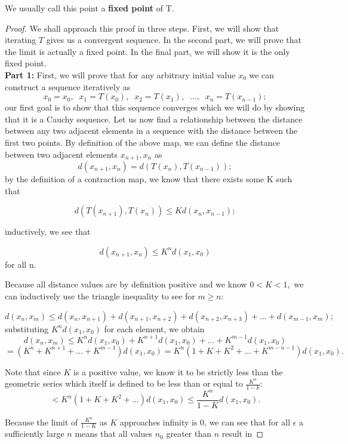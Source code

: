 \documentclass{article}
\theoremstyle{remark}
\begin{document}
We usually call this point a \textbf{fixed point} of T.
\begin{proof}

We shall approach this proof in three steps. First, we will show that iterating $T$ gives us a convergent sequence. In the second part, we will prove that the limit is actually a fixed point. In the final part, we will show it is the only fixed point.\\

\textbf{Part 1: }First, we will prove that for any arbitrary initial value $x_0$ we can construct a sequence iteratively as 
$$x_0 = x_0, \;\; x_1 = T(x_0), \;\;x_2 = T(x_1), \;\;..., \;\;x_n = T(x_{n-1});$$
our first goal is to show that this sequence converges which we will do by showing that it is a Cauchy sequence.
Let us now find a relationship between the distance between any two adjacent elements in a sequence with the distance between the first two points. By definition of the above map, we can define the distance between two adjacent elements $x_{n+1}, x_{n}$ as
$$d(x_{n+1} , x_{n}) = d(T(x_{n}) , T(x_{n-1}));$$
by the definition of a contraction map, we know that there exists some K such that

$$d(T(x_{n+1}) , T(x_{n})) \leq Kd(x_{n}, x_{n-1}); $$


inductively, we see that

$$d(x_{n+1} , x_{n}) \leq K^{n}d(x_{1}, x_{0})$$
for all n.

Because all distance values are by definition positive and we know $0<K<1,$  we can inductively use the triangle inequality to see for $m \geq n$:

$$d(x_{n} , x_{m}) \leq d(x_n, x_{n+1}) + d(x_{n+1}, x_{n+2}) + d(x_{n+2}, x_{n+3}) +  ... + d(x_{m-1}, x_{m});$$
substituting $K^{n}d(x_{1}, x_{0})$ for each element, we obtain
$$d(x_{n} , x_{m}) \leq K^{n}d(x_{1}, x_{0}) + K^{n+1}d(x_{1}, x_{0}) + ... + K^{m-1}d(x_{1}, x_{0})$$
$$ = (K^n + K^{n+1} + ... + K^{m-1})d(x_1, x_0) = K^n(1+ K + K^2 + ... + K^{m-n-1})d(x_1, x_0).$$

Note that since $K$ is a positive value, we know it to be strictly less than the geometric series which itself is defined to be less than or equal to $\frac{K^n}{1-k}$:
$$ < K^n(1+ K + K^2 + ... )d(x_1, x_0) \leq \frac{K^n}{1-K}d(x_1, x_0).$$

Because the limit of $\frac{K^n}{1-K}$ as $K$ approaches infinity is 0, we can see that for all $\epsilon$ a sufficiently large $n$ means that all values $n_0$ greater than $n$ result in 


\end{proof}
\end{document}
